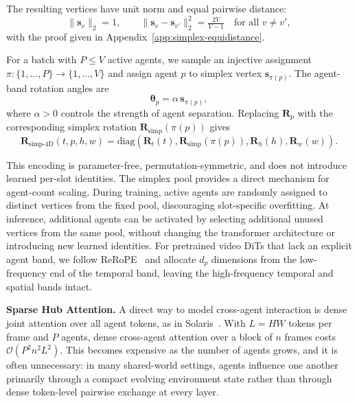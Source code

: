 The resulting vertices have unit norm and equal pairwise distance:
\begin{equation}
\|\mathbf{s}_v\|_2=1,\qquad
\|\mathbf{s}_v-\mathbf{s}_{v'}\|_2^2=\tfrac{2V}{V-1}
\quad\text{for all }v\neq v',
\end{equation}
with the proof given in Appendix~\ref{app:simplex-equidistance}.


For a batch with $P\leq V$ active agents, we sample an injective assignment
$\pi:\{1,\ldots,P\}\rightarrow\{1,\ldots,V\}$
and assign agent $p$ to simplex vertex $\mathbf{s}_{\pi(p)}$.
The agent-band rotation angles are
\begin{equation}
\boldsymbol{\theta}_p=\alpha\,\mathbf{s}_{\pi(p)},
\end{equation}
where $\alpha>0$ controls the strength of agent separation.
Replacing $\mathbf{R}_{p}$ with the corresponding simplex rotation $\mathbf{R}_{\mathrm{simp}}(\pi(p))$ gives
\begin{equation}
\mathbf{R}_{\mathrm{simp\text{-}4D}}(t,p,h,w)
=
\mathrm{diag}\!\left(
\mathbf{R}_{t}(t),
\mathbf{R}_{\mathrm{simp}}(\pi(p)),
\mathbf{R}_{h}(h),
\mathbf{R}_{w}(w)
\right).
\end{equation}

This encoding is parameter-free, permutation-symmetric, and does not introduce learned per-slot identities.
The simplex pool provides a direct mechanism for agent-count scaling.
During training, active agents are randomly assigned to distinct vertices from the fixed pool, discouraging slot-specific overfitting.
At inference, additional agents can be activated by selecting additional unused vertices from the same pool, without changing the transformer architecture or introducing new learned identities.
For pretrained video DiTs that lack an explicit agent band, we follow ReRoPE~\cite{li2026rerope} and allocate $d_p$ dimensions from the low-frequency end of the temporal band, leaving the high-frequency temporal and spatial bands intact.



\noindent\textbf{Sparse Hub Attention.}
\label{sec:sparse-hub-attention}
A direct way to model cross-agent interaction is dense joint attention over all agent tokens, as in Solaris~\cite{savva2026solaris}.
With $L=HW$ tokens per frame and $P$ agents, dense cross-agent attention over a block of $n$ frames costs $\mathcal{O}(P^2n^2L^2)$.
This becomes expensive as the number of agents grows, and it is often unnecessary: in many shared-world settings, agents influence one another primarily through a compact evolving environment state rather than through dense token-level pairwise exchange at every layer.

